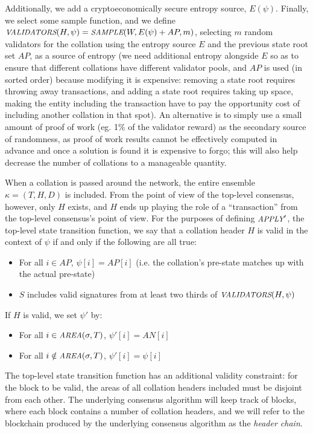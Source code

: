 \documentclass[11pt,a4paper]{article}
\makeatletter
\theoremstyle{plain}
\theoremstyle{definition}
\theoremstyle{remark}
\newcommand{\ie}{i.e.\@\xspace}
\newcommand{\makeintoafunction}[1]{\textit{\uppercase{\small #1}}}
\newcommand{\APPLY}{\makeintoafunction{apply}}
\newcommand{\AREA}{\makeintoafunction{area}}
\newcommand{\VALIDATORS}{\makeintoafunction{validators}}
\newcommand{\SAMPLE}{\makeintoafunction{sample}}
\makeatother
\begin{document}
Additionally, we add a cryptoeconomically secure entropy source, $E(\psi)$. Finally, we select some sample function, and we define $\VALIDATORS(H, \psi) = \SAMPLE(W, E(\psi) + AP, m)$, selecting $m$ random validators for the collation using the entropy source $E$ and the previous state root set $AP$, as a source of entropy (we need additional entropy alongside $E$ so as to ensure that different collations have different validator pools, and $AP$ is used (in sorted order) because modifying it is expensive: removing a state root requires throwing away transactions, and adding a state root requires taking up space, making the entity including the transaction have to pay the opportunity cost of including another collation in that spot). An alternative is to simply use a small amount of proof of work (eg. 1\% of the validator reward) as the secondary source of randomness, as proof of work results cannot be effectively computed in advance and once a solution is found it is expensive to forgo; this will also help decrease the number of collations to a manageable quantity.

When a collation is passed around the network, the entire ensemble $\kappa = (T, H, D)$ is included. From the point of view of the top-level consensus, however, only $H$ exists, and $H$ ends up playing the role of a ``transaction'' from the top-level consensus's point of view. For the purposes of defining $\APPLY'$, the top-level state transition function, we say that a collation header $H$ is valid in the context of $\psi$ if and only if the following are all true:

\begin{itemize}
\item
For all $i \in AP$, $\psi[i] = AP[i]$ (\ie the collation's pre-state matches up with the actual pre-state)
\item
$S$ includes valid signatures from at least two thirds of $\VALIDATORS(H, \psi)$
\end{itemize}

If $H$ is valid, we set $\psi'$ by:

\begin{itemize}
\item
For all $i \in \AREA(\sigma, T)$, $\psi'[i] = AN[i]$
\item
For all $i \notin \AREA(\sigma, T)$, $\psi'[i] = \psi[i]$
\end{itemize}

The top-level state transition function has an additional validity constraint: for the block to be valid, the areas of all collation headers included must be disjoint from each other. The underlying consensus algorithm will keep track of blocks, where each block contains a number of collation headers, and we will refer to the blockchain produced by the underlying consensus algorithm as the \emph{header chain}.
\end{document}

